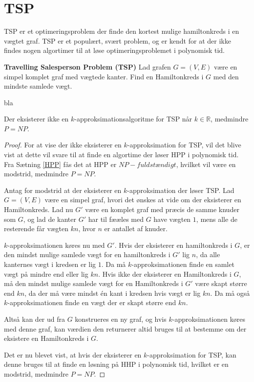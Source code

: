 \section{TSP}
TSP er et optimeringsproblem der finde den kortest mulige hamiltonkreds i en vægtet graf. TSP er et populært, svært problem, og er kendt for at der ikke findes nogen algortimer til at løse optimeringsproblemet i polynomisk tid. 

\begin{tcolorbox}
	\textbf{Travelling Salesperson Problem (TSP)} \quad Lad grafen $G=(V,E)$ være en simpel komplet graf med vægtede kanter. Find en Hamiltonkreds i $G$ med den mindste samlede vægt.
\end{tcolorbox}

bla
\begin{thm}
	Der eksisterer ikke en $k$-approksimationsalgoritme for TSP når $k \in \mathbb{R}$, medmindre $P = NP$.
\end{thm}
\begin{proof}
	For at vise der ikke eksisterer en $k$-approksimation for TSP, vil det blive vist at dette vil svare til at finde en algortime der løser HPP i polynomisk tid.
	Fra Sætning \ref{HPP} fås det at HPP er $NP-fuldstændigt$, hvilket vil være en modstrid, medmindre $P=NP$.

	Antag for modstrid at der eksisterer en $k$-approksimation der løser TSP.
	Lad $G=(V,E)$ være en simpel graf, hvori det ønskes at vide om der eksisterer en Hamiltonkreds.
	Lad nu $G'$ være en komplet graf med præcis de samme knuder som $G$, og lad de kanter $G'$ har til fææles med $G$ have vægten $1$, mens alle de resterende får vægten $kn$, hvor $n$ er antallet af knuder.

	$k$-approksimationen køres nu med $G'$.
	Hvis der eksisterer en hamiltonkreds i $G$, er den mindst mulige samlede vægt for en hamiltonkreds i $G'$ lig $n$, da alle kanternes vægt i kredsen er lig $1$.
	Da må $k$-approksimationen finde en samlet vægt på mindre end eller lig $kn$.
	Hvis ikke der eksisterer en Hamiltonkreds i $G$, må den mindst mulige samlede vægt for en Hamiltonkreds i $G'$ være skapt større end $kn$, da der må være mindst én kant i kredsen hvis vægt er lig $kn$.
	Da må også $k$-approksimationen finde en vægt der er skapt større end $kn$.

	Altså kan der ud fra $G$ konstrueres en ny graf, og hvis $k$-approksimationen køres med denne graf, kan værdien den returnerer altid bruges til at bestemme om der eksistere en Hamiltonkreds i $G$.

	Det er nu blevet vist, at hvis der eksisterer en $k$-approksimation for TSP, kan denne bruges til at finde en løsning på HHP i polynomisk tid, hvilket er en modstrid, medmindre $P=NP$.
\end{proof}


